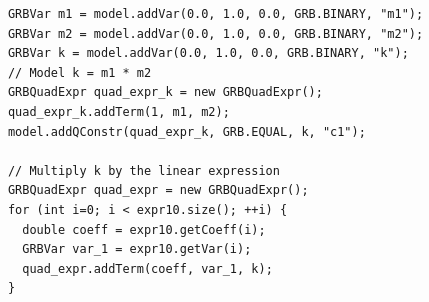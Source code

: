         \begin{lstlisting}
            GRBVar m1 = model.addVar(0.0, 1.0, 0.0, GRB.BINARY, "m1");
            GRBVar m2 = model.addVar(0.0, 1.0, 0.0, GRB.BINARY, "m2");
            GRBVar k = model.addVar(0.0, 1.0, 0.0, GRB.BINARY, "k");
            // Model k = m1 * m2
            GRBQuadExpr quad_expr_k = new GRBQuadExpr();
            quad_expr_k.addTerm(1, m1, m2);
            model.addQConstr(quad_expr_k, GRB.EQUAL, k, "c1");
            
            // Multiply k by the linear expression
            GRBQuadExpr quad_expr = new GRBQuadExpr();
            for (int i=0; i < expr10.size(); ++i) {
              double coeff = expr10.getCoeff(i);
              GRBVar var_1 = expr10.getVar(i);
              quad_expr.addTerm(coeff, var_1, k);
            }
            
    \end{lstlisting}
    
